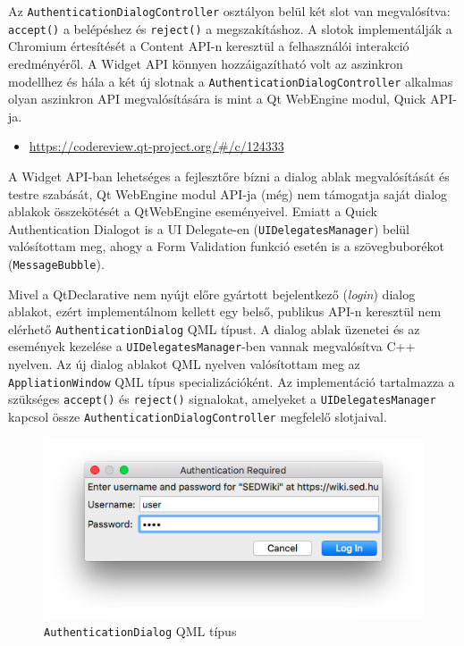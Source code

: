 \documentclass[12pt]{report}
\let\origurl\url
\renewcommand{\url}[1]{%
    \textcolor{blue}{\origurl{#1}}
}
\newcommand{\gerrit}[1]{%
    \textcolor{qtgreen}{\origurl{https://codereview.qt-project.org/\#/c/#1}}
}
\begin{document}
Az \texttt{AuthenticationDialogController} osztályon belül két slot van megvalósítva:
\texttt{accept()} a belépéshez és \texttt{reject()} a megszakításhoz. A slotok implementálják
a Chromium értesítését a Content API-n keresztül a felhasználói interakció eredményéről.
A Widget API könnyen hozzáigazítható volt az aszinkron modellhez és hála a két új slotnak a
\texttt{AuthenticationDialogController} alkalmas olyan aszinkron API megvalósítására is mint
a Qt WebEngine modul, Quick API-ja.

\begin{center}
    \begin{reviewbox}
        \begin{itemize}
            \renewcommand{\labelitemi}{\textcolor{qtgreen}{$\blacktriangleright$}}
            \item \gerrit{124333}
        \end{itemize}
    \end{reviewbox}
\end{center}

A Widget API-ban lehetséges a fejlesztőre bízni a dialog ablak megvalósítását és
testre szabását, Qt WebEngine modul API-ja (még) nem támogatja saját dialog ablakok
összekötését a QtWebEngine eseményeivel. Emiatt a Quick Authentication Dialogot is a
UI Delegate-en (\texttt{UIDelegatesManager}) belül valósítottam meg, ahogy a Form Validation
funkció esetén is a szövegbuborékot (\texttt{MessageBubble}).

Mivel a QtDeclarative nem nyújt előre gyártott bejelentkező (\textit{login}) dialog ablakot,
ezért implementálnom kellett egy belső, publikus API-n keresztül nem elérhető
\texttt{AuthenticationDialog} QML típust. A dialog ablak üzenetei és az események kezelése
a \texttt{UIDelegatesManager}-ben vannak megvalósítva C++ nyelven. Az új dialog ablakot QML
nyelven valósítottam meg az \texttt{AppliationWindow} QML típus specializációként. Az
implementáció tartalmazza a szükséges \texttt{accept()} és \texttt{reject()} signalokat,
amelyeket a \texttt{UIDelegatesManager} kapcsol össze \texttt{AuthenticationDialogController}
megfelelő slotjaival.
\begin{figure}[ht]
    \centering
    \includegraphics[scale=0.8]{ad-quick-screenshot}
    \caption{
        \label{fig:ad-quick-screenshot}
        \texttt{AuthenticationDialog} QML típus
    }
\end{figure}
\end{document}
